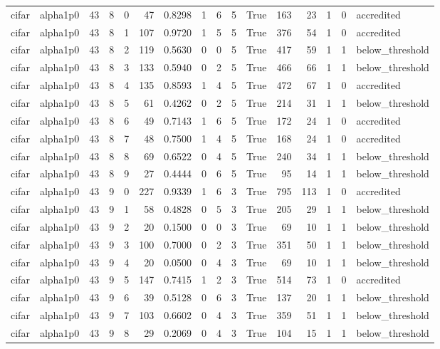 \begin{tabular}{llrrrrrrrrrrrrrl}
cifar & alpha1p0 & 43 & 8 & 0 & 47 & 0.8298 & 1 & 6 & 5 & True & 163 & 23 & 1 & 0 & accredited \\
cifar & alpha1p0 & 43 & 8 & 1 & 107 & 0.9720 & 1 & 5 & 5 & True & 376 & 54 & 1 & 0 & accredited \\
cifar & alpha1p0 & 43 & 8 & 2 & 119 & 0.5630 & 0 & 0 & 5 & True & 417 & 59 & 1 & 1 & below\_threshold \\
cifar & alpha1p0 & 43 & 8 & 3 & 133 & 0.5940 & 0 & 2 & 5 & True & 466 & 66 & 1 & 1 & below\_threshold \\
cifar & alpha1p0 & 43 & 8 & 4 & 135 & 0.8593 & 1 & 4 & 5 & True & 472 & 67 & 1 & 0 & accredited \\
cifar & alpha1p0 & 43 & 8 & 5 & 61 & 0.4262 & 0 & 2 & 5 & True & 214 & 31 & 1 & 1 & below\_threshold \\
cifar & alpha1p0 & 43 & 8 & 6 & 49 & 0.7143 & 1 & 6 & 5 & True & 172 & 24 & 1 & 0 & accredited \\
cifar & alpha1p0 & 43 & 8 & 7 & 48 & 0.7500 & 1 & 4 & 5 & True & 168 & 24 & 1 & 0 & accredited \\
cifar & alpha1p0 & 43 & 8 & 8 & 69 & 0.6522 & 0 & 4 & 5 & True & 240 & 34 & 1 & 1 & below\_threshold \\
cifar & alpha1p0 & 43 & 8 & 9 & 27 & 0.4444 & 0 & 6 & 5 & True & 95 & 14 & 1 & 1 & below\_threshold \\
cifar & alpha1p0 & 43 & 9 & 0 & 227 & 0.9339 & 1 & 6 & 3 & True & 795 & 113 & 1 & 0 & accredited \\
cifar & alpha1p0 & 43 & 9 & 1 & 58 & 0.4828 & 0 & 5 & 3 & True & 205 & 29 & 1 & 1 & below\_threshold \\
cifar & alpha1p0 & 43 & 9 & 2 & 20 & 0.1500 & 0 & 0 & 3 & True & 69 & 10 & 1 & 1 & below\_threshold \\
cifar & alpha1p0 & 43 & 9 & 3 & 100 & 0.7000 & 0 & 2 & 3 & True & 351 & 50 & 1 & 1 & below\_threshold \\
cifar & alpha1p0 & 43 & 9 & 4 & 20 & 0.0500 & 0 & 4 & 3 & True & 69 & 10 & 1 & 1 & below\_threshold \\
cifar & alpha1p0 & 43 & 9 & 5 & 147 & 0.7415 & 1 & 2 & 3 & True & 514 & 73 & 1 & 0 & accredited \\
cifar & alpha1p0 & 43 & 9 & 6 & 39 & 0.5128 & 0 & 6 & 3 & True & 137 & 20 & 1 & 1 & below\_threshold \\
cifar & alpha1p0 & 43 & 9 & 7 & 103 & 0.6602 & 0 & 4 & 3 & True & 359 & 51 & 1 & 1 & below\_threshold \\
cifar & alpha1p0 & 43 & 9 & 8 & 29 & 0.2069 & 0 & 4 & 3 & True & 104 & 15 & 1 & 1 & below\_threshold \\

\end{tabular}
